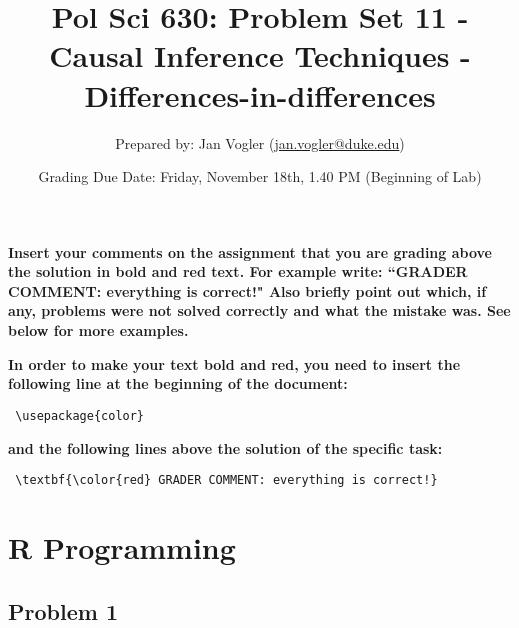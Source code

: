 \documentclass[12pt]{article}\usepackage[]{graphicx}\usepackage[]{color}
\begin{document}
\title{Pol Sci 630: Problem Set 11 - Causal Inference Techniques - Differences-in-differences}

\author{Prepared by: Jan Vogler (\href{mailto:jan.vogler@duke.edu}{jan.vogler@duke.edu})}

\date{Grading Due Date: Friday, November 18th, 1.40 PM (Beginning of Lab)}
 
\maketitle



\textbf{\color{red} Insert your comments on the assignment that you are grading above the solution in bold and red text. For example write: ``GRADER COMMENT: everything is correct!" Also briefly point out which, if any, problems were not solved correctly and what the mistake was. See below for more examples.}

\bigskip

\textbf{In order to make your text bold and red, you need to insert the following line at the beginning of the document:}

\begin{verbatim} \usepackage{color} \end{verbatim}

\textbf{and the following lines above the solution of the specific task:}

\begin{verbatim} \textbf{\color{red} GRADER COMMENT: everything is correct!} \end{verbatim}



\pagebreak

\section*{R Programming}

\subsection*{Problem 1}
\end{document}
